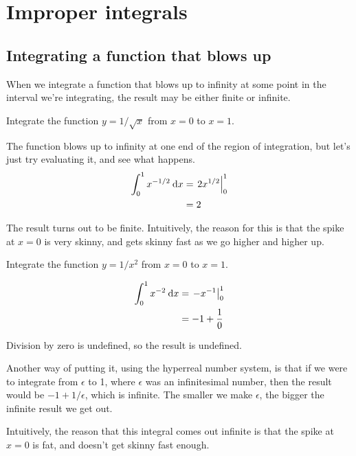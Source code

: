 \chapter{Improper integrals}

\section{Integrating a function that blows up}
When we integrate a function that blows up to infinity at some
point in the interval we're integrating, the result may be either
finite or infinite.

\begin{eg}\label{eg:improper-a}
\egquestion Integrate the function $y=1/\sqrt{x}$ from $x=0$ to $x=1$.

\eganswer The function blows up to infinity at one end of the region
of integration, but let's just try evaluating it, and see what happens.
\begin{align*}
  \int_0^1 x^{-1/2}\:\textup{d} x &= \left.2x^{1/2}\right|_0^1 \\
                         &= 2
\end{align*}

The result turns out to be finite. Intuitively, the reason for this
is that the spike at $x=0$ is very skinny, and gets skinny fast
as we go higher and higher up.
\end{eg}


\pagebreak

\begin{eg}
\egquestion Integrate the function $y=1/x^2$ from $x=0$ to $x=1$.

\eganswer 
\begin{align*}
  \int_0^1 x^{-2}\:\textup{d} x &= \left.-x^{-1}\right|_0^1 \\
                         &= -1+\frac{1}{0}
\end{align*}

Division by zero is undefined, so the result is undefined.

Another way of putting it, using the hyperreal number system,
is that if we were to integrate
from $\epsilon$ to 1, where $\epsilon$ was an infinitesimal
number, then the result would be $-1+1/\epsilon$, which is
infinite. The smaller we make $\epsilon$, the bigger the
infinite result we get out.

Intuitively, the reason that this integral comes out infinite is
that the spike at $x=0$ is fat, and doesn't get skinny fast enough.
\end{eg}

